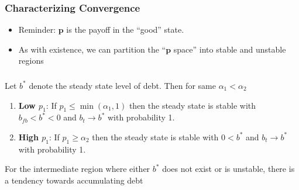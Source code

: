 \documentclass{beamer}
\begin{document}
% 
% 
 \begin{frame}
  \frametitle{Characterizing Convergence}

  \begin{itemize}
  \item Reminder:  $\bm{p}$ is the payoff in the ``good'' state.
   \item As with existence, we can partition  the ``$\bm{p}$ space'' into stable and unstable regions
   
  \end{itemize}
  
  
  
  \end{frame}
  
  \begin{frame}
  \frametitle{}
  
  \small
 	\begin{theorem}
Let $b^*$ denote the steady state level of debt.  Then for  same $  \alpha_1 < \alpha_2$
		\begin{enumerate}
			\item  \textbf{Low $p_1$}: If $p_1\leq\min(\alpha_1,1)$ then the steady state is stable with $b_{fb}<b^*<0$ and $b_t\rightarrow b^*$ with probability 1.
			\item \textbf{High  $p_1$}:  If $p_1 \geq \alpha_2$ then the steady state is stable with $0<b^*$ and $b_t \rightarrow b^*$ with probability 1.
			
			
			\end{enumerate}
			\end{theorem}
			
			For the intermediate region where either $b^*$ does not exist or is unstable, there is a tendency towards accumulating debt
		
		
	
 \end{frame}
\end{document}
